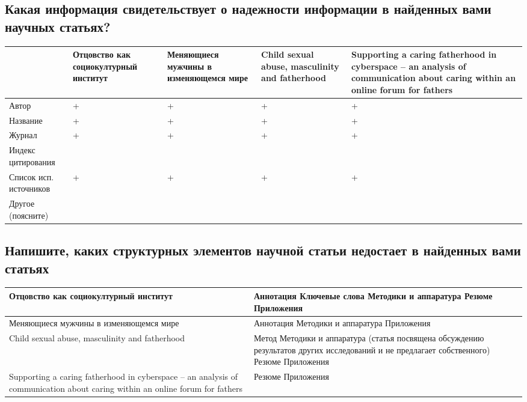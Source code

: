 \documentclass{../../common/thesisbyxetex}
\begin{document}
\subsection*{Какая информация свидетельствует о надежности информации в найденных вами научных статьях? }
\begin{tabular}[t]{|P{0.14\textwidth}|P{0.17\textwidth}|P{0.17\textwidth}|P{0.17\textwidth}|P{0.17\textwidth}|}
\hline
&
Отцовство как социокултурный институт &
Меняющиеся мужчины в изменяющемся мире &
Child sexual abuse, masculinity and fatherhood &
Supporting a caring fatherhood in cyberspace – an analysis of communication about caring within an online forum for
fathers \\ \hline

Автор & + & + & + & + \\ \hline
Название & + & + & + & + \\ \hline
Журнал & + & + & + & + \\ \hline
Индекс цитирования &  &  &  &  \\ \hline
Список исп. источников & + & + & + & + \\ \hline
Другое (поясните) &  &  &  &  \\ \hline

\end{tabular}

\subsection*{Напишите, каких структурных элементов научной статьи недостает в найденных вами статьях}
\begin{tabular}[t]{|P{0.25\textwidth}|P{0.65\textwidth}|}
\hline
Отцовство как социокултурный институт &
Аннотация \newline
Ключевые слова \newline
Методики и аппаратура \newline
Резюме \newline
Приложения \\ \hline


Меняющиеся мужчины в изменяющемся мире &
Аннотация \newline
Методики и аппаратура \newline
Приложения \\ \hline

Child sexual abuse, masculinity and fatherhood &
Метод\newline
Методики и аппаратура (статья посвящена обсуждению результатов других исследований и не предлагает
собственного)\newline
Резюме \newline
Приложения \\ \hline

Supporting a caring fatherhood in cyberspace – an analysis of communication about caring within an online forum for
fathers &
Резюме\newline
Приложения \\ \hline

\end{tabular}
\end{document}
